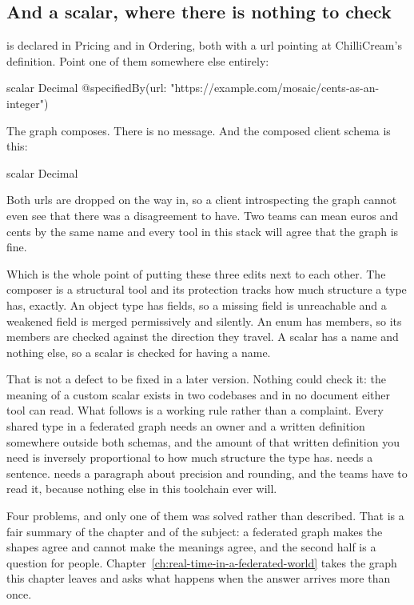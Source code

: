 \subsection*{And a scalar, where there is nothing to check}

%
 is declared in Pricing and in Ordering, both with a
 url pointing at ChilliCream's definition. Point one of them
somewhere else entirely:

\begin{graphqlsdl}[fontsize=\footnotesize]
scalar Decimal @specifiedBy(url: "https://example.com/mosaic/cents-as-an-integer")
\end{graphqlsdl}

The graph composes. There is no message. And the composed client schema is this:

\begin{graphqlsdl}[fontsize=\footnotesize]
scalar Decimal
\end{graphqlsdl}

Both urls are dropped on the way in, so a client introspecting the graph cannot
even see that there was a disagreement to have. Two teams can mean euros and
cents by the same name and every tool in this stack will agree that the graph is
fine.

%
Which is the whole point of putting these three edits next to each other. The
composer is a structural tool and its protection tracks how much structure a type
has, exactly. An object type has fields, so a missing field is unreachable and a
weakened field is merged permissively and silently. An enum has members, so its
members are checked against the direction they travel. A scalar has a name and
nothing else, so a scalar is checked for having a name.

That is not a defect to be fixed in a later version. Nothing could check it: the
meaning of a custom scalar exists in two codebases and in no document either tool
can read. What follows is a working rule rather than a complaint. Every shared
type in a federated graph needs an owner and a written definition somewhere
outside both schemas, and the amount of that written definition you need is
inversely proportional to how much structure the type has.  needs a
sentence.  needs a paragraph about precision and rounding, and the
teams have to read it, because nothing else in this toolchain ever will.

\medskip
Four problems, and only one of them was solved rather than described. That is a
fair summary of the chapter and of the subject: a federated graph makes the
shapes agree and cannot make the meanings agree, and the second half is a
question for people. Chapter~\ref{ch:real-time-in-a-federated-world} takes the
graph this chapter leaves and asks what happens when the answer arrives more than
once.

%
